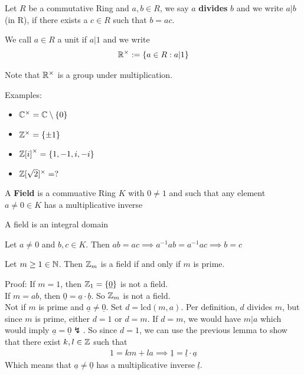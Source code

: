 \begin{definition}[]
				Let $R$ be a commutative Ring and $a,b \in R$, we say $a$ \textbf{divides} $b$ and we write $a | b$ (in R), if there exists a $c \in R$ such that $b = ac$.
\end{definition}

\begin{definition}[]
	We  call $a \in R$ a unit if $a|1$ and we write 
	\begin{align*}
		\mathbb{R}^\times := \{a \in R: a|1\}
	\end{align*}
\end{definition}
Note that $\mathbb{R}^\times$ is a group under multiplication. 



Examples:
\begin{itemize}
				\item $\mathbb{C}^\times = \mathbb{C} \setminus\{0\}$
	\item $\mathbb{Z}^\times = \{\pm 1\}$
	\item ${\mathbb{Z}[i]}^\times = \{1,-1,i,-i\}$
	\item $\mathbb{Z}[\sqrt{2}]^\times = ?$
\end{itemize}



\begin{definition}[Field]
	A \textbf{Field} is a commuative Ring $K$ with $0 \neq 1$ and such that any element $a \neq 0 \in K$ has a multiplicative inverse
\end{definition}


\begin{lemma}[]
	A field is an integral domain
\end{lemma}
Let $a \neq 0$ and $b,c \in K$. Then $ab = ac \implies a^{-1}ab = a^{-1}ac \implies b = c$


\begin{proposition}[]
	Let $m \geq 1 \in \mathbb{N}$. Then $\mathbb{Z}_m$ is a field if and only if $m$ is prime.
\end{proposition}
Proof: If $m = 1$, then $\mathbb{Z}_1 = \{ \underline{0} \}$ is not a field.\\
If $m = ab$, then $ \underline{0}  = \underline{a}  \cdot  \underline{b} $. So $\mathbb{Z}_m$ is not a field.\\

Not if $m$ is prime and $ \underline{a}  \neq \underline{0}$. Set $d = \text{lcd}(m,a)$. Per definition, $d$ divides $m$, but since $m$ is prime, either $d = 1$ or $d = m$. 
If $d = m$, we would have $m | a$ which would imply $ \underline{a}  = \underline{0} \lightning$. 
So since $d = 1$, we can use the previous lemma to show that there exist $k,l \in \mathbb{Z}$ such that
\begin{align*}
	1 = km + la \implies \underline{1}  = \underline{l}  \cdot  \underline{a} 
\end{align*}
Which means that $ \underline{a} \neq \underline{0} $ has a multiplicative inverse $ \underline{l} $.




